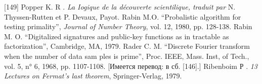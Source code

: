 \documentclass{mai_book}
\begin{document}
[149] Popper K. R . {\itshape La Iogique de la d\'{e}couverte scientilique, traduit par} N. Thyssen-Rutten et P. Devaux, Payot.
\newline
[150] Rabin M.O. “Probalistic algorithm for testing primality”, {\itshape Journal of Number Theory}, vol. 12, 1980, pp. 128-138.
\newline
[151] Rabin M. O. “Digitalized signatures and public-key functions as in­ tractable as factorization”, Cambridge, MA, 1979.
\newline
[152] Rader C. M. “Discrete Fourier transform when the number of data sam­ ples is prime”, Proc. IEEE, Mass. Inst, of Tech., vol. 5, n° 6, 1968, pp. 1107-1108. [Имеется перевод: в сб. [146].]
\newline
[153] Ribenboim Р . {\itshape 13 Lectures on Fermat’s last theorem}, Springer-Verlag, 1979.
\end{document}
